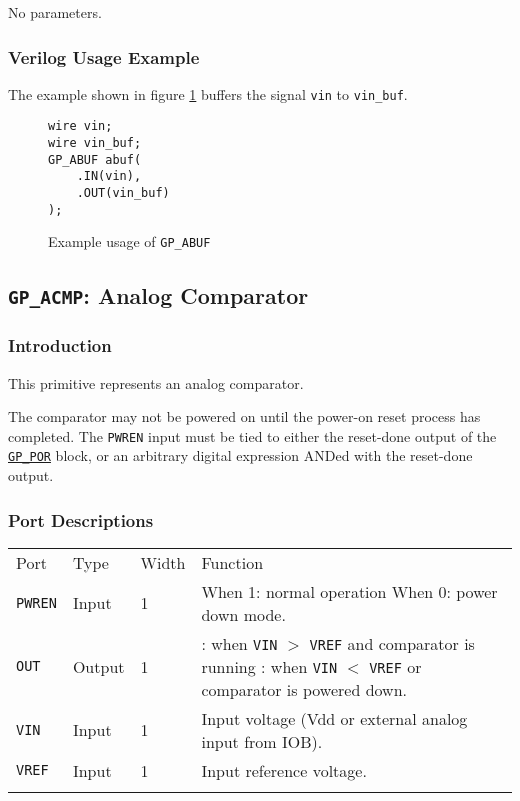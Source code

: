 \documentclass[11pt]{article}
\newcommand{\tokenstyle}[1]{\texttt{#1}}
\newcommand{\wirestyle}[1]{\texttt{#1}}
\newcommand{\whenstyle}[1]{{\fontseries{sb}\selectfont#1}}
\newcommand{\tokenref}[2]{\hyperref[#2]{\tokenstyle{#1}}}
\newcommand{\thinhline}{\Xhline{1\arrayrulewidth}}
\newcommand{\thickhline}{\Xhline{2.5\arrayrulewidth}}
\begin{document}
No parameters.

\subsubsection{Verilog Usage Example}

The example shown in figure \ref{gp-abuf-example} buffers the signal \wirestyle{vin} to \wirestyle{vin\_buf}.

\begin{figure}[h]
\begin{lstlisting}
wire vin;
wire vin_buf;
GP_ABUF abuf(
	.IN(vin),
	.OUT(vin_buf)
);
\end{lstlisting}
\caption{Example usage of \tokenstyle{GP\_ABUF}}
\label{gp-abuf-example}
\end{figure}


\pagebreak
\subsection{\tokenstyle{GP\_ACMP}: Analog Comparator}
\label{gp-acmp}

\subsubsection{Introduction}
This primitive represents an analog comparator.

The comparator may not be powered on until the power-on reset process has completed. The \tokenstyle{PWREN} input must be tied to
either the reset-done output of the \tokenref{GP\_POR}{gp-por} block, or an arbitrary digital expression ANDed with the reset-done output.

\subsubsection{Port Descriptions}

\begin{tabularx}{\textwidth}{lllX}
\thinhline
\whenstyle{Port} & \whenstyle{Type} & \whenstyle{Width} & \whenstyle{Function} \\
\thickhline
\tokenstyle{PWREN} & Input & 1 &
	\whenstyle{When 1:} normal operation \newline
	\whenstyle{When 0:} power down mode. \\
\thinhline
\tokenstyle{OUT} & Output & 1 &
	\whenstyle{1:} when \tokenstyle{VIN} $>$ \tokenstyle{VREF} and comparator is running \newline
	\whenstyle{0:} when \tokenstyle{VIN} $<$ \tokenstyle{VREF} or comparator is powered down. \\
\thinhline
\tokenstyle{VIN} & Input & 1 & Input voltage (Vdd or external analog input from IOB). \\
\thinhline
\tokenstyle{VREF} & Input & 1 & Input reference voltage. \\
\thinhline
\end{tabularx}
\end{document}
